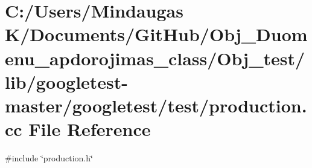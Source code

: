 \hypertarget{_obj__test_2lib_2googletest-master_2googletest_2test_2production_8cc}{}\section{C\+:/\+Users/\+Mindaugas K/\+Documents/\+Git\+Hub/\+Obj\+\_\+\+Duomenu\+\_\+apdorojimas\+\_\+class/\+Obj\+\_\+test/lib/googletest-\/master/googletest/test/production.cc File Reference}
\label{_obj__test_2lib_2googletest-master_2googletest_2test_2production_8cc}
{\ttfamily \#include \char`\"{}production.\+h\char`\"{}}\newline
